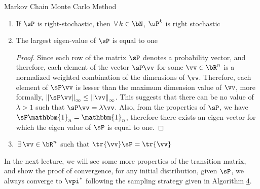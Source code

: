 \documentclass[11pt,a4paper]{article}
\begin{document}
\begin{ssection}{Markov Chain Monte Carlo Method}
	\begin{enumerate}
		\item If $\sP$ is right-stochastic, then $\qforall k \in \bN$, $\sP^k$ is right stochastic
		\item The largest eigen-value of $\sP$ is equal to one
			\begin{proof}
				Since each row of the matrix $\sP$ denotes a probability vector, and therefore, each element of the vector $\sP \vv$ for some $\vv \in \bR^n$ is a normalized weighted combination of the dimensions of $\vv$. Therefore, each element of $\sP \vv$ is lesser than the maximum dimension value of $\vv$, more formally, $\norm{\sP \vv}_{\infty} \le \norm{\vv}_{\infty}$. This suggests that there can be no value of $\lambda > 1$ such that $\sP \vv = \lambda \vv$. Also, from the properties of $\sP$, we have $\sP \mathbbm{1}_n = \mathbbm{1}_n$, therefore there exists an eigen-vector for which the eigen value of $\sP$ is equal to one.
			\end{proof}
		\item $\qexists \vv \in \bR^n$ such that $\tr{\vv} \sP = \tr{\vv}$
	\end{enumerate}

	In the next lecture, we will see some more properties of the transition matrix, and show the proof of convergence, \ie for any initial distribution, given $\sP$, we always converge to $\vpi^{\ast}$ following the sampling strategy given in Algorithm \hyperlink{algo:4}{4}.

\end{ssection}



\end{document}
